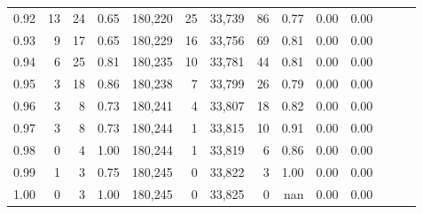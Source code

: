 \begin{tabular}{rrrrrrrrrrrrrr}
0.92 &      13 &   24 &  0.65 &  180,220 &       25 &  33,739 &      86 &  0.77 &  0.00 &      0.00 \\
0.93 &       9 &   17 &  0.65 &  180,229 &       16 &  33,756 &      69 &  0.81 &  0.00 &      0.00 \\
0.94 &       6 &   25 &  0.81 &  180,235 &       10 &  33,781 &      44 &  0.81 &  0.00 &      0.00 \\
0.95 &       3 &   18 &  0.86 &  180,238 &        7 &  33,799 &      26 &  0.79 &  0.00 &      0.00 \\
0.96 &       3 &    8 &  0.73 &  180,241 &        4 &  33,807 &      18 &  0.82 &  0.00 &      0.00 \\
0.97 &       3 &    8 &  0.73 &  180,244 &        1 &  33,815 &      10 &  0.91 &  0.00 &      0.00 \\
0.98 &       0 &    4 &  1.00 &  180,244 &        1 &  33,819 &       6 &  0.86 &  0.00 &      0.00 \\
0.99 &       1 &    3 &  0.75 &  180,245 &        0 &  33,822 &       3 &  1.00 &  0.00 &      0.00 \\
1.00 &       0 &    3 &  1.00 &  180,245 &        0 &  33,825 &       0 &   nan &  0.00 &      0.00 \\
\bottomrule
\end{tabular}
